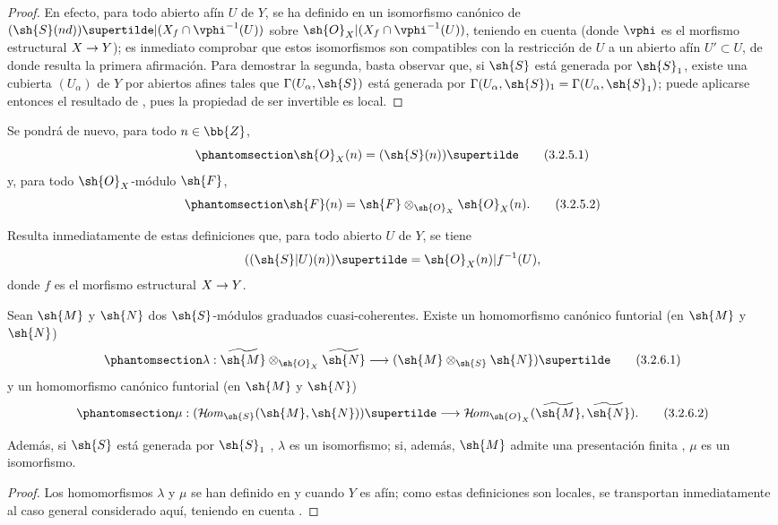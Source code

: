 \documentclass[oneside,10pt]{amsart}
\makeatletter
\newcommand{\ega@arrow}[2]{\mathchoice{#1}{#2}{#2}{#2}}
\renewcommand{\to}{\ega@arrow{\longrightarrow}{\rightarrow}}
\def\shHom{\mathcal{H}\!\mathit{om}}
\let\EGAOriginalLabel\label
\renewcommand{\label}[1]{\phantomsection\EGAOriginalLabel{#1}}
\makeatother
\begin{document}
\begin{proof}
En efecto, para todo abierto afín $U$ de $Y$, se ha definido en  un isomorfismo canónico de $(\sh{S}(nd))\supertilde|(X_f\cap\vphi^{-1}(U))$ sobre $\sh{O}_X|(X_f\cap\vphi^{-1}(U))$, teniendo en cuenta  (donde $\vphi$ es el morfismo estructural $X\to Y$); es inmediato comprobar que estos isomorfismos son compatibles con la restricción de $U$ a un abierto afín $U'\subset U$, de donde resulta la primera afirmación.
Para demostrar la segunda, basta observar que, si $\sh{S}$ está generada por $\sh{S}_1$, existe una cubierta $(U_\alpha)$ de $Y$ por abiertos afines tales que $\Gamma(U_\alpha,\sh{S})$ está generada por $\Gamma(U_\alpha,\sh{S})_1=\Gamma(U_\alpha,\sh{S}_1)$; puede aplicarse entonces el resultado de , pues la propiedad de ser invertible es local.
\end{proof}

Se pondrá de nuevo, para todo $n\in\bb{Z}$,
\[
\label{II.3.2.5.1}
  \sh{O}_X(n)=(\sh{S}(n))\supertilde
\tag{3.2.5.1}
\]
y, para todo $\sh{O}_X$-módulo $\sh{F}$,
\[
\label{II.3.2.5.2}
  \sh{F}(n)=\sh{F}\otimes_{\sh{O}_X}\sh{O}_X(n).
\tag{3.2.5.2}
\]

Resulta inmediatamente de estas definiciones que, para todo abierto $U$ de $Y$, se tiene
\[
  ((\sh{S}|U)(n))\supertilde=\sh{O}_X(n)|f^{-1}(U),
\]
donde $f$ es el morfismo estructural $X\to Y$.

\begin{proposition}[3.2.6]
\label{II.3.2.6}
Sean $\sh{M}$ y $\sh{N}$ dos $\sh{S}$-módulos graduados cuasi-coherentes.
Existe un homomorfismo canónico funtorial (en $\sh{M}$ y $\sh{N}$)
\[
\label{II.3.2.6.1}
  \lambda:\widetilde{\sh{M}}\otimes_{\sh{O}_X}\widetilde{\sh{N}}\to(\sh{M}\otimes_{\sh{S}}\sh{N})\supertilde
\tag{3.2.6.1}
\]
y un homomorfismo canónico funtorial (en $\sh{M}$ y $\sh{N}$)
\[
\label{II.3.2.6.2}
  \mu:(\shHom_{\sh{S}}(\sh{M},\sh{N}))\supertilde\to\shHom_{\sh{O}_X}(\widetilde{\sh{M}},\widetilde{\sh{N}}).
\tag{3.2.6.2}
\]

Además, si $\sh{S}$ está generada por $\sh{S}_1$ , $\lambda$ es un isomorfismo; si, además, $\sh{M}$ admite una presentación finita , $\mu$ es un isomorfismo.
\end{proposition}

\begin{proof}
Los homomorfismos $\lambda$ y $\mu$ se han definido en  y  cuando $Y$ es afín; como estas definiciones son locales, se transportan inmediatamente al caso general considerado aquí, teniendo en cuenta .
\end{proof}
\end{document}
